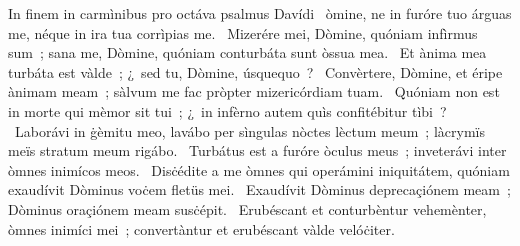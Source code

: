 { In finem in carmìnibus pro octáva psalmus Davídi}
{%
~òmine, ne in furóre tuo árguas me, néque in ira tua corrìpias me.
~Mizerére mei, Dòmine, quóniam infìrmus sum~; sana me, Dòmine, quóniam conturbáta sunt òssua mea.
~Et ànima mea turbáta est vàlde~; ¿~sed tu, Dòmine, úsquequo~?
~Convèrtere, Dòmine, et éripe ànimam meam~; sàlvum me fac pròpter mizericórdiam tuam.
~Quóniam non est in morte qui mèmor sit tui~; ¿~in infèrno autem quìs confitébitur tìbi~?
~Laborávi in ġèmitu meo, lavábo per sìngulas nòctes lèctum meum~; làcrymïs meïs stratum meum rigábo.
~Turbátus est a furóre òculus meus~; inveterávi inter òmnes inimícos meos.
~Disċédite a me òmnes qui operámini iniquitátem, quóniam exaudívit Dòminus voċem fletüs mei.
~Exaudívit Dòminus deprecaçiónem meam~; Dòminus oraçiónem meam susċépit.
~Erubéscant et conturbèntur vehemènter, òmnes inimíci mei~; convertàntur et erubéscant vàlde velóċiter.
}
